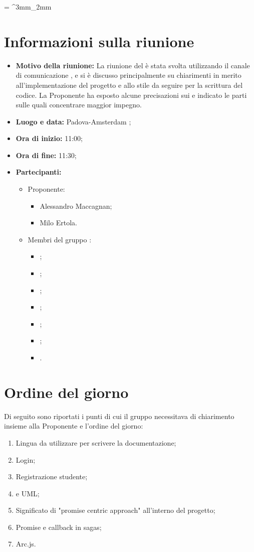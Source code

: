 \documentclass[VER-2017-11-22.tex]{subfiles}
\begin{document}
\tabulinesep = ^3mm_2mm
\chapter{Informazioni sulla riunione} 
\begin{itemize}
	\item \textbf{Motivo della riunione:} La riunione del  è stata svolta utilizzando il canale di comunicazione , e si è discusso principalmente su chiarimenti in merito all'implementazione del progetto e allo stile da seguire per la scrittura del codice. La Proponente ha esposto alcune precisazioni sui  e indicato le parti sulle quali concentrare maggior impegno.
	\item \textbf{Luogo e data:} Padova-Amsterdam ;
	\item \textbf{Ora di inizio:} 11:00;
	\item \textbf{Ora di fine:} 11:30;
	\item \textbf{Partecipanti:}
	\begin{itemize}
	\item Proponente:
		\begin{itemize}
			\item Alessandro Maccagnan;
			\item Milo Ertola.
		\end{itemize}
	\item Membri del gruppo \gruppo:
		\begin{itemize}
			\item \Davide;
			\item \Elena;
			\item \Gianluca;
			\item \Mirco;
			\item \Parwinder;
			\item \Riccardo;
			\item \Valentina.
		\end{itemize}
	\end{itemize}
\end{itemize}

\chapter{Ordine del giorno}
Di seguito sono riportati i punti di cui il gruppo \gruppo necessitava di chiarimento insieme alla Proponente e l'ordine del giorno:
\begin{enumerate}
	\item Lingua da utilizzare per scrivere la documentazione;
	\item Login;
	\item Registrazione studente;
	\item {} e UML;
	\item Significato di "promise centric approach" all'interno del progetto;
	\item Promise e callback in  sagas;
	\item Arc.js.
\end{enumerate}
\end{document}
